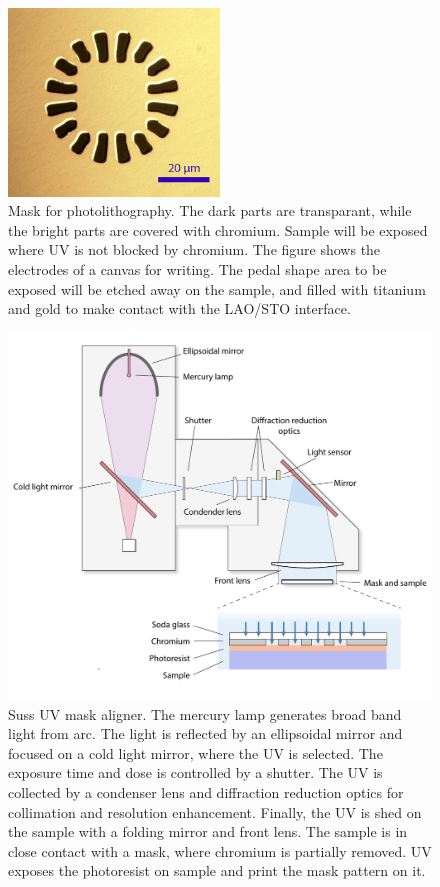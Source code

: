 \documentclass[pdflatex, sectionletters, 12pt]{pittetd}    %
\begin{document}
\begin{figure}[h!]
	\centering
	\includegraphics[width=0.5\textwidth]{Drawing/MASK.png}
	\caption{Mask for photolithography. The dark parts are transparant, while the bright parts are covered with chromium. Sample will be exposed where UV is not blocked by chromium. The figure shows the electrodes of a canvas for writing. The pedal shape area to be exposed will be etched away on the sample, and filled with titanium and gold to make contact with the LAO/STO interface.}
	\label{FIG:MASK}
\end{figure}

\begin{figure}[hp!]
	\centering
	\includegraphics[width=1.0\textwidth]{Drawing/Suss.pdf}
	\caption{Suss UV mask aligner. The mercury lamp generates broad band light from arc. The light is reflected by an ellipsoidal mirror and focused on a cold light mirror, where the UV is selected. The exposure time and dose is controlled by a shutter. The UV is collected by a condenser lens and diffraction reduction optics for collimation and resolution enhancement. Finally, the UV is shed on the sample with a folding mirror and front lens. The sample is in close contact with a mask, where chromium is partially removed. UV exposes the photoresist on sample and print the mask pattern on it.}
	\label{FIG:Suss}
\end{figure}
\end{document}
